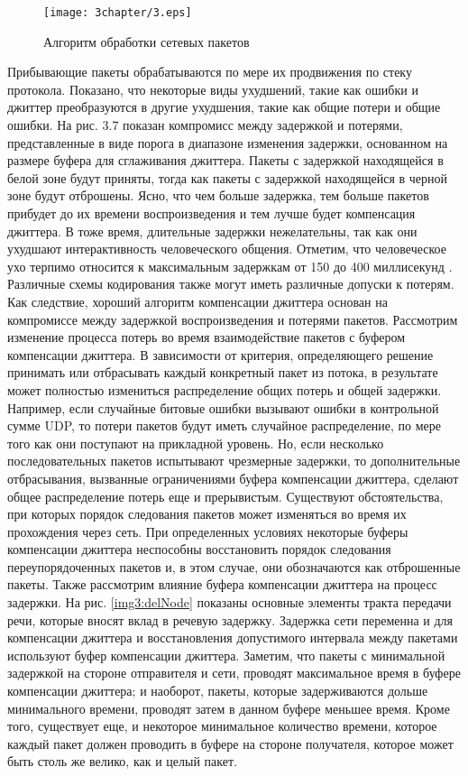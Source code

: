 \begin{figure} [h]
  \center
\texttt{[image: 3chapter/3.eps]}
  \caption{Алгоритм обработки сетевых пакетов}
  \label{img3:algh_pack}
\end{figure}

Прибывающие пакеты обрабатываются по мере их продвижения по стеку протокола. Показано, что некоторые виды ухудшений, такие как ошибки и джиттер преобразуются в другие ухудшения, такие как общие потери и общие ошибки.
На рис. 3.7 показан компромисс между задержкой и потерями, представленные в виде порога в диапазоне изменения задержки, основанном на размере буфера для сглаживания джиттера. Пакеты с задержкой находящейся в белой зоне будут приняты, тогда как пакеты с задержкой находящейся в черной зоне будут отброшены. Ясно, что чем больше задержка, тем больше пакетов прибудет до их времени воспроизведения и тем лучше будет компенсация джиттера. В тоже время, длительные задержки нежелательны, так как они ухудшают интерактивность человеческого общения. Отметим, что человеческое ухо терпимо относится к максимальным задержкам от 150 до 400 миллисекунд \cite{Moon}. Различные схемы кодирования также могут иметь различные допуски к потерям. Как следствие, хороший алгоритм компенсации джиттера основан на компромиссе между задержкой воспроизведения и потерями пакетов.
Рассмотрим изменение процесса потерь во время взаимодействие пакетов с буфером компенсации джиттера. В зависимости от критерия, определяющего решение принимать или отбрасывать каждый конкретный пакет из потока, в результате может полностью измениться распределение общих потерь и общей задержки. Например, если случайные битовые ошибки вызывают ошибки в контрольной сумме UDP, то потери пакетов будут иметь случайное распределение, по мере того как они поступают на прикладной уровень. Но, если несколько последовательных пакетов испытывают чрезмерные задержки, то дополнительные отбрасывания, вызванные ограничениями буфера компенсации джиттера, сделают общее распределение потерь еще и прерывистым.
Существуют обстоятельства, при которых порядок следования пакетов может изменяться во время их прохождения через сеть. При определенных условиях некоторые буферы компенсации джиттера неспособны восстановить порядок следования переупорядоченных пакетов и, в этом случае, они обозначаются как отброшенные пакеты.
Также рассмотрим влияние буфера компенсации джиттера на процесс задержки. На рис. \ref{img3:delNode} показаны основные элементы тракта передачи речи, которые вносят вклад в речевую задержку. Задержка сети переменна и для компенсации джиттера и восстановления допустимого интервала между пакетами используют буфер компенсации джиттера. Заметим, что пакеты с минимальной задержкой на стороне отправителя и сети, проводят максимальное время в буфере компенсации джиттера; и наоборот, пакеты, которые задерживаются дольше минимального времени, проводят затем в данном буфере меньшее время. Кроме того, существует еще, и некоторое минимальное количество времени, которое каждый пакет должен проводить в буфере на стороне получателя, которое может быть столь же велико, как и целый пакет.


